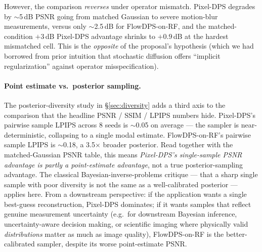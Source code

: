 \documentclass{article}
\begin{document}
However, the comparison \emph{reverses} under operator mismatch.
Pixel-DPS degrades by $\sim$5\,dB PSNR going from matched Gaussian to
severe motion-blur measurements, versus only $\sim$2.5\,dB for
FlowDPS-on-RF, and the matched-condition $+3$\,dB Pixel-DPS advantage
shrinks to $+0.9$\,dB at the hardest mismatched cell. This is the
\emph{opposite} of the proposal's hypothesis (which we had borrowed from
prior intuition that stochastic diffusion offers ``implicit
regularization'' against operator misspecification).

\paragraph{Point estimate vs.\ posterior sampling.}
The posterior-diversity study in \S\ref{sec:diversity} adds a third
axis to the comparison that the headline PSNR / SSIM / LPIPS numbers
hide. Pixel-DPS's pairwise sample LPIPS across 8 seeds is $\sim$0.05
on average --- the sampler is near-deterministic, collapsing to a
single modal estimate. FlowDPS-on-RF's pairwise sample LPIPS is
$\sim$0.18, a 3.5$\times$ broader posterior. Read together with the
matched-Gaussian PSNR table, this means \emph{Pixel-DPS's single-sample
PSNR advantage is partly a point-estimate advantage}, not a true
posterior-sampling advantage. The classical Bayesian-inverse-problems
critique --- that a sharp single sample with poor diversity is not the
same as a well-calibrated posterior --- applies here. From a downstream
perspective: if the application wants a single best-guess
reconstruction, Pixel-DPS dominates; if it wants samples that reflect
genuine measurement uncertainty (e.g.\ for downstream Bayesian
inference, uncertainty-aware decision making, or scientific imaging
where physically valid \emph{distributions} matter as much as image
quality), FlowDPS-on-RF is the better-calibrated sampler, despite its
worse point-estimate PSNR.
\end{document}
